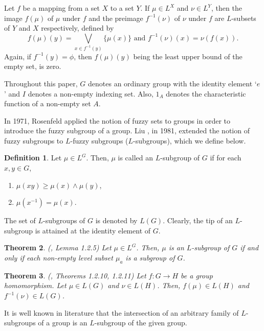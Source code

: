 \documentclass[10pt]{article}
\theoremstyle{plain}
\newtheorem{theorem}{Theorem}[section]
\theoremstyle{definition}
\newtheorem{definition}[theorem]{Definition}
\theoremstyle{remark}
\theoremstyle{case}
\begin{document}
Let $f$ be a mapping from a set $X$ to a set $Y$. If $\mu \in L ^{X}$ and $\nu \in L^{Y}$, then the image $f(\mu )$
of $\mu $ under $f$ and the preimage $f^{-1} (\nu )$ of $\nu $ under $f$ are $L$-subsets of $Y$ and $X$ respectively, defined by
\[
f(\mu )(y)=\bigvee\limits_{x\in f^{-1} (y)} \{\mu (x)\} \text{ and } f^{-1} (\nu )(x)=\nu (f(x)).
\]
Again,  if $f^{-1} (y)=\phi $,
then $f(\mu )(y)$ being the least upper bound of the empty set, is zero.


Throughout this paper, $G$ denotes an ordinary group with the identity element `$e$' and $I$ denotes a non-empty indexing set. Also, $1_A$ denotes the characteristic function of a non-empty set $A$.

In 1971, Rosenfeld \cite{rosenfeld_fuzzy} applied the notion of fuzzy sets to groups in order to introduce the fuzzy subgroup of a group. Liu \cite{liu_op}, in 1981, extended the notion of fuzzy subgroups to $L$-fuzzy subgroups ($L$-subgroups), which we define below.   

\begin{definition}
	Let $\mu \in L ^G $. Then, $\mu $ is called an $L$-subgroup of $G$ if for each $x, y\in G$,
	\begin{enumerate}
		\item[({i})] $\mu (xy)\ge \mu (x)\wedge \mu (y)$,
		\item[({ii})] $\mu (x^{-1} )=\mu (x)$.
	\end{enumerate}
	The set of $L$-subgroups of $G$ is denoted by $L(G)$. Clearly, the tip of an $L$-subgroup
	is attained at the identity element of $G$.
\end{definition}

\begin{theorem}(\cite{mordeson_comm}, Lemma 1.2.5)
	\label{lev_gp}
	Let $\mu \in L ^G $. Then, $\mu $ is an $L$-subgroup of $G$ if and only if each non-empty level subset $\mu_{a} $ is a subgroup of $G$.
\end{theorem}

\begin{theorem}(\cite{mordeson_comm}, Theorems 1.2.10, 1.2.11)
	\label{hom_gp}
	Let $f : G \rightarrow H$ be a group homomorphism. Let $\mu \in L(G)$ and $\nu \in L(H)$. Then, $f(\mu) \in L(H)$ and $f^{-1}(\nu) \in L(G)$.
\end{theorem}

It is well known in literature that the intersection of an arbitrary family of $L$-subgroups of a group is an $L$-subgroup of the given group. 
\end{document}
